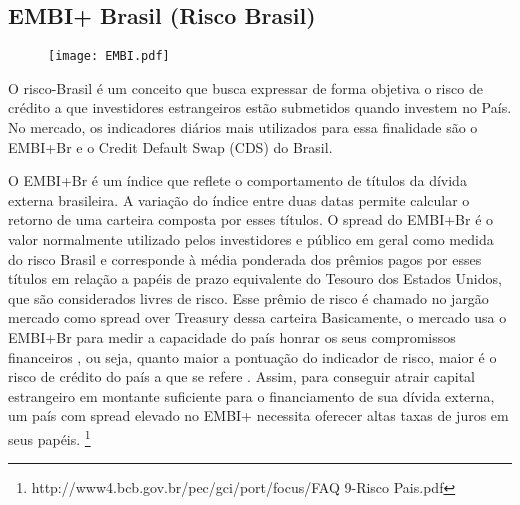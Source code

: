 \documentclass[../../relatorio.tex]{subfiles}
\begin{document}
\subsection{EMBI+ Brasil (Risco Brasil)}

\begin{figure}[ht]
  \begin{minipage}{0.70\textheight}
    \centering
      \texttt{[image: EMBI.pdf]}
  \end{minipage}
\end{figure}

O risco-Brasil é um conceito que busca expressar de forma objetiva o risco de crédito a que investidores estrangeiros estão submetidos quando investem no País. No mercado, os indicadores diários mais utilizados para essa finalidade são o EMBI+Br e o Credit Default Swap (CDS) do Brasil.

O EMBI+Br é um índice que reflete o comportamento de títulos da dívida externa brasileira. A variação do índice entre duas datas permite calcular o retorno de uma carteira composta por esses títulos. O spread do EMBI+Br é o valor normalmente utilizado pelos investidores e público em geral como medida do risco Brasil e corresponde à média ponderada dos prêmios pagos por esses títulos em relação a papéis de prazo equivalente do Tesouro dos Estados Unidos, que são considerados livres de risco. Esse prêmio de risco é chamado no jargão mercado como spread over Treasury dessa carteira  Basicamente, o mercado usa o EMBI+Br para medir a capacidade do país honrar os seus compromissos financeiros , ou seja, quanto maior a pontuação do indicador de risco, maior é o risco de crédito do país a que se refere . Assim, para conseguir atrair capital estrangeiro em montante suficiente para o financiamento de sua dívida externa, um país com spread elevado no EMBI+ necessita oferecer altas taxas de juros em seus papéis. \footnote{http://www4.bcb.gov.br/pec/gci/port/focus/FAQ 9-Risco Pais.pdf}

\pagebreak
\end{document}
